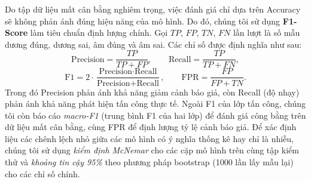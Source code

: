 Do tập dữ liệu mất cân bằng nghiêm trọng, việc đánh giá chỉ dựa trên Accuracy sẽ không phản ánh đúng hiệu năng của mô hình. Do đó, chúng tôi sử dụng \textbf{F1-Score} làm tiêu chuẩn định lượng chính. Gọi $TP$, $FP$, $TN$, $FN$ lần lượt là số mẫu dương đúng, dương sai, âm đúng và âm sai. Các chỉ số được định nghĩa như sau:
\begin{equation}
\text{Precision} = \frac{TP}{TP+FP}, \qquad \text{Recall} = \frac{TP}{TP+FN},
\end{equation}
\begin{equation}
\text{F1} = 2\cdot\frac{\text{Precision}\cdot\text{Recall}}{\text{Precision}+\text{Recall}}, \qquad \text{FPR} = \frac{FP}{FP+TN}.
\end{equation}
Trong đó Precision phản ánh khả năng giảm cảnh báo giả, còn Recall (độ nhạy) phản ánh khả năng phát hiện tấn công thực tế. Ngoài F1 của lớp tấn công, chúng tôi còn báo cáo \emph{macro-F1} (trung bình F1 của hai lớp) để đánh giá công bằng trên dữ liệu mất cân bằng, cùng FPR để định lượng tỷ lệ cảnh báo giả. Để xác định liệu các chênh lệch nhỏ giữa các mô hình có ý nghĩa thống kê hay chỉ là nhiễu, chúng tôi sử dụng \emph{kiểm định McNemar} cho các cặp mô hình trên cùng tập kiểm thử và \emph{khoảng tin cậy 95\%} theo phương pháp bootstrap (1000 lần lấy mẫu lại) cho các chỉ số chính.

